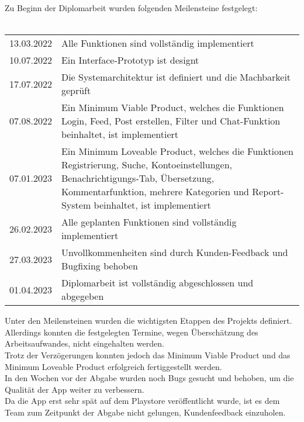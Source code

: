 Zu Beginn der Diplomarbeit wurden folgenden Meilensteine festgelegt:
\\\\
\begin{tabular}{|c|p{10cm}|}
    \hline
    13.03.2022 & Alle Funktionen sind vollständig implementiert                                                                                                                                                                           \\
    10.07.2022 & Ein Interface-Prototyp ist designt                                                                                                                                                                                       \\
    17.07.2022 & Die Systemarchitektur ist definiert und die Machbarkeit geprüft                                                                                                                                                          \\
    07.08.2022 & Ein Minimum Viable Product, welches die Funktionen Login, Feed, Post erstellen, Filter und Chat-Funktion beinhaltet, ist implementiert                                                                                   \\
    07.01.2023 & Ein Minimum Loveable Product, welches die Funktionen Registrierung, Suche, Kontoeinstellungen, Benachrichtigungs-Tab, Übersetzung, Kommentarfunktion, mehrere Kategorien und Report-System beinhaltet, ist implementiert \\
    26.02.2023 & Alle geplanten Funktionen sind vollständig implementiert                                                                                                                                                                 \\
    27.03.2023 & Unvollkommenheiten sind durch Kunden-Feedback und Bugfixing behoben                                                                                                                                                      \\
    01.04.2023 & Diplomarbeit ist vollständig abgeschlossen und abgegeben                                                                                                                                                                 \\
    \hline
\end{tabular}

Unter den Meilensteinen wurden die wichtigsten Etappen des Projekts definiert. Allerdings konnten die festgelegten Termine, wegen Überschätzung des Arbeitsaufwandes, nicht eingehalten werden.
\\
Trotz der Verzögerungen konnten jedoch das Minimum Viable Product und das Minimum Loveable Product erfolgreich fertiggestellt werden.
\\
In den Wochen vor der Abgabe wurden noch Bugs gesucht und behoben, um die Qualität der App weiter zu verbessern.
\\
Da die App erst sehr spät auf dem Playstore veröffentlicht wurde, ist es dem Team zum Zeitpunkt der Abgabe nicht gelungen, Kundenfeedback einzuholen.


